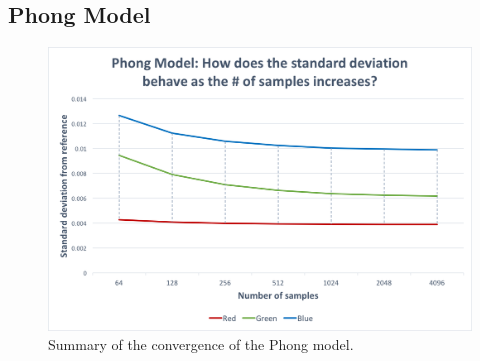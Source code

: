 \documentclass{article}
\begin{document}
\subsection*{Phong Model}
\begin{figure}[h]
\centering
\includegraphics[width=\textwidth]{assets/phong_stdev}

\caption{Summary of the convergence of the Phong model.}
\end{figure}
\end{document}
